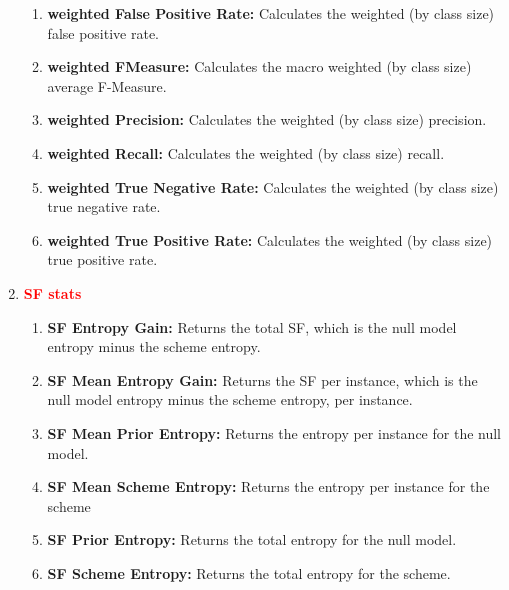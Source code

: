 \documentclass[a4paper,12pt, english]{article}
\begin{document}
\begin{enumerate}
\begin{enumerate}
\item \textbf{weighted False Positive Rate: }
          Calculates the weighted (by class size) false positive rate.                    

\item \textbf{weighted FMeasure: }
          Calculates the macro weighted (by class size) average F-Measure. 
                 
\item \textbf{weighted Precision: }
          Calculates the weighted (by class size) precision. 
                    
\item \textbf{weighted Recall: }
          Calculates the weighted (by class size) recall.          

\item \textbf{weighted True Negative Rate: }
          Calculates the weighted (by class size) true negative rate. 

\item \textbf{weighted True Positive Rate: }
          Calculates the weighted (by class size) true positive rate. 
\end{enumerate}
     

\item \textbf{\textcolor{red}{SF stats}}
\begin{enumerate}
              
\item \textbf{SF Entropy Gain: }
          Returns the total SF, which is the null model entropy minus the scheme entropy.    
          

\item \textbf{SF Mean Entropy Gain: }
          Returns the SF per instance, which is the null model entropy minus the scheme entropy, per instance.         
          

\item \textbf{SF Mean Prior Entropy: }
          Returns the entropy per instance for the null model.       
          
\item \textbf{SF Mean Scheme Entropy: }
          Returns the entropy per instance for the scheme        


\item \textbf{SF Prior Entropy: }
          Returns the total entropy for the null model.
          
\item \textbf{SF Scheme Entropy: }
          Returns the total entropy for the scheme. 


\end{enumerate}
\end{enumerate}
\end{document}
